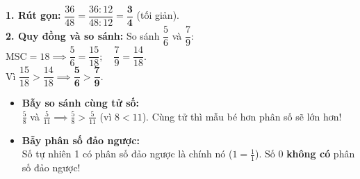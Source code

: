 \documentclass[14pt,a4paper,oneside]{extbook}
\begin{document}
\vspace{-2.5mm}
\noindent
\begin{minipage}[t]{0.49\textwidth}\vspace{0pt}
\begin{tcolorbox}[
  enhanced,
  colback=green!4!white,
  colframe=green!60!black,
  arc=2mm, boxrule=0.8pt,
  left=2mm, right=2mm, top=1.8mm, bottom=1.8mm,
  title={\footnotesize\bfseries\color{white}\faCheckCircle\ Ví dụ thực hành chuẩn mực}
]
{\footnotesize
\textbf{1. Rút gọn:} $\dfrac{36}{48} = \dfrac{36 : 12}{48 : 12} = \mathbf{\dfrac{3}{4}}$ (tối giản).\\
\textbf{2. Quy đồng và so sánh:} So sánh $\dfrac{5}{6}$ và $\dfrac{7}{9}$:\\
$\text{MSC} = 18 \implies \dfrac{5}{6} = \dfrac{15}{18}; \quad \dfrac{7}{9} = \dfrac{14}{18}$.\\
Vì $\dfrac{15}{18} > \dfrac{14}{18} \implies \mathbf{\dfrac{5}{6} > \dfrac{7}{9}}$.
}
\end{tcolorbox}
\end{minipage}
\hfill
\begin{minipage}[t]{0.49\textwidth}\vspace{0pt}
\begin{tcolorbox}[
  enhanced,
  colback=red!4!white,
  colframe=red!70!black,
  arc=2mm, boxrule=0.8pt,
  left=2mm, right=2mm, top=1.8mm, bottom=1.8mm,
  title={\footnotesize\bfseries\color{white}\faExclamationTriangle\ Mẹo tránh bẫy trắc nghiệm}
]
{\footnotesize
\begin{itemize}\setlength{\itemsep}{1.5pt}\setlength{\leftskip}{-2.5mm}
  \item \textbf{Bẫy so sánh cùng tử số:}\\
  $\frac{5}{8}$ và $\frac{5}{11} \implies \frac{5}{8} > \frac{5}{11}$ (vì $8 < 11$). Cùng tử thì mẫu bé hơn phân số sẽ lớn hơn!
  \item \textbf{Bẫy phân số đảo ngược:}\\
  Số tự nhiên 1 có phân số đảo ngược là chính nó ($1 = \frac{1}{1}$). Số 0 \textbf{không có} phân số đảo ngược!
\end{itemize}
}
\end{tcolorbox}
\end{minipage}
\end{document}
